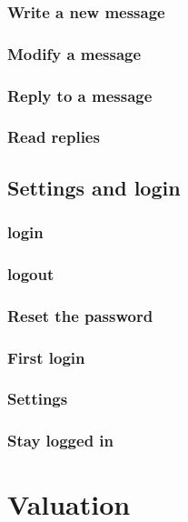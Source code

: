 \documentclass[12pt,a4paper,oneside]{report}
\begin{document}
\subsection{Write a new message}

\subsection{Modify a message}

\subsection{Reply to a message}

\subsection{Read replies}

\section{Settings and login}

\subsection{login}

\subsection{logout}

\subsection{Reset the password}

\subsection{First login}

\subsection{Settings}

\subsection{Stay logged in}

\chapter{Valuation}
\end{document}
